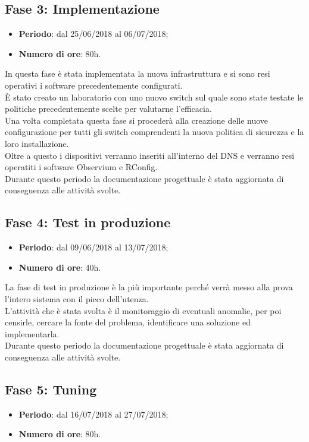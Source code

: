 \documentclass[Tesi.tex]{subfiles}
\begin{document}
\subsection{Fase 3: Implementazione}
\begin{itemize}
	\item \textbf{Periodo}: dal 25/06/2018 al 06/07/2018;
	\item \textbf{Numero di ore}: 80h.
\end{itemize}
	
In questa fase è stata implementata la nuova infrastruttura e si sono resi operativi i software precedentemente configurati. \\
\`{E} stato creato un laboratorio con uno nuovo switch sul quale sono state testate le politiche precedentemente scelte per valutarne l'efficacia.\\
Una volta completata questa fase si procederà alla creazione delle nuove configurazione per tutti gli switch comprendenti la nuova politica di sicurezza e la loro installazione. \\
Oltre a questo i dispositivi verranno inseriti all'interno del DNS e verranno resi operatiti i software Observium e RConfig. \\
Durante questo periodo la documentazione progettuale è stata aggiornata di conseguenza alle attività svolte.\\
	

\subsection{Fase 4: Test in produzione}
\begin{itemize}
	\item \textbf{Periodo}: dal 09/06/2018 al 13/07/2018;
	\item \textbf{Numero di ore}: 40h.
\end{itemize}
	
La fase di test in produzione è la più importante perché verrà messo alla prova l'intero sistema con il picco dell'utenza. \\
L'attività che è stata svolta è il monitoraggio di eventuali anomalie, per poi censirle, cercare la fonte del problema, identificare una soluzione ed implementarla. \\
Durante questo periodo la documentazione progettuale è stata aggiornata di conseguenza alle attività svolte.\\

	

\subsection{Fase 5: Tuning}
\begin{itemize}
	\item \textbf{Periodo}: dal 16/07/2018 al 27/07/2018;
	\item \textbf{Numero di ore}: 80h.
\end{itemize}
	
\end{document}
